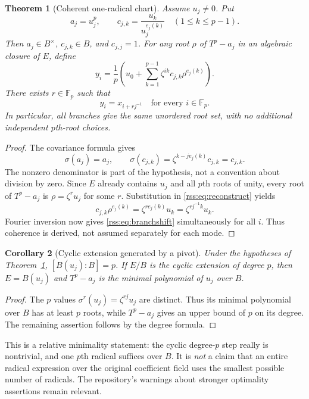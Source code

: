 \documentclass[11pt,a4paper]{article}
\newtheorem{theorem}{Theorem}[section]
\newtheorem{corollary}[theorem]{Corollary}
\theoremstyle{definition}
\theoremstyle{remark}
\newcommand{\F}{\mathbb F}
\begin{document}
\begin{theorem}[Coherent one-radical chart]\label{rss:thm:chart}
Assume $u_j\neq0$. Put
\begin{equation}
 a_j=u_j^p,\qquad
 c_{j,k}=\frac{u_k}{u_j^{e_j(k)}}\quad(1\leq k\leq p-1).
 \label{rss:eq:ratios}
\end{equation}
Then $a_j\in B^\times$, $c_{j,k}\in B$, and $c_{j,j}=1$.
For \emph{any} root $\rho$ of $T^p-a_j$ in an algebraic closure of $E$,
define
\begin{equation}
 y_i=\frac1p\left(u_0+
       \sum_{k=1}^{p-1}\zeta^{ik}c_{j,k}\rho^{e_j(k)}\right).
 \label{rss:eq:reconstruct}
\end{equation}
There exists $r\in\F_p$ such that
\begin{equation}
 y_i=x_{i+rj^{-1}}\quad\text{for every }i\in\F_p.
 \label{rss:eq:branchshift}
\end{equation}
In particular, all branches give the same unordered root set, with no
additional independent $p$th-root choices.
\end{theorem}
\begin{proof}
The covariance formula gives
\[
 \sigma(a_j)=a_j,\qquad
 \sigma(c_{j,k})=\zeta^{k-je_j(k)}c_{j,k}=c_{j,k}.
\]
The nonzero denominator is part of the hypothesis, not a convention about
division by zero. Since $E$ already contains $u_j$ and all $p$th roots of
unity, every root of $T^p-a_j$ is $\rho=\zeta^r u_j$ for some $r$.
Substitution in \eqref{rss:eq:reconstruct} yields
\[
 c_{j,k}\rho^{e_j(k)}
 =\zeta^{r e_j(k)}u_k
 =\zeta^{rj^{-1}k}u_k.
\]
Fourier inversion now gives \eqref{rss:eq:branchshift} simultaneously for all
$i$. Thus coherence is derived, not assumed separately for each mode.
\end{proof}

\begin{corollary}[Cyclic extension generated by a pivot]\label{rss:cor:generator}
Under the hypotheses of Theorem~\ref{rss:thm:chart},
$[B(u_j):B]=p$. If $E/B$ is the cyclic extension of degree $p$, then
$E=B(u_j)$ and $T^p-a_j$ is the minimal polynomial of $u_j$ over $B$.
\end{corollary}
\begin{proof}
The $p$ values $\sigma^r(u_j)=\zeta^{rj}u_j$ are distinct. Thus its
minimal polynomial over $B$ has at least $p$ roots, while $T^p-a_j$ gives
an upper bound of $p$ on its degree. The remaining assertion follows by
the degree formula.
\end{proof}

This is a relative minimality statement: the cyclic degree-$p$ step really
is nontrivial, and one $p$th radical suffices over $B$. It is \emph{not} a
claim that an entire radical expression over the original coefficient field
uses the smallest possible number of radicals. The repository's warnings
about stronger optimality assertions remain relevant.
\end{document}
